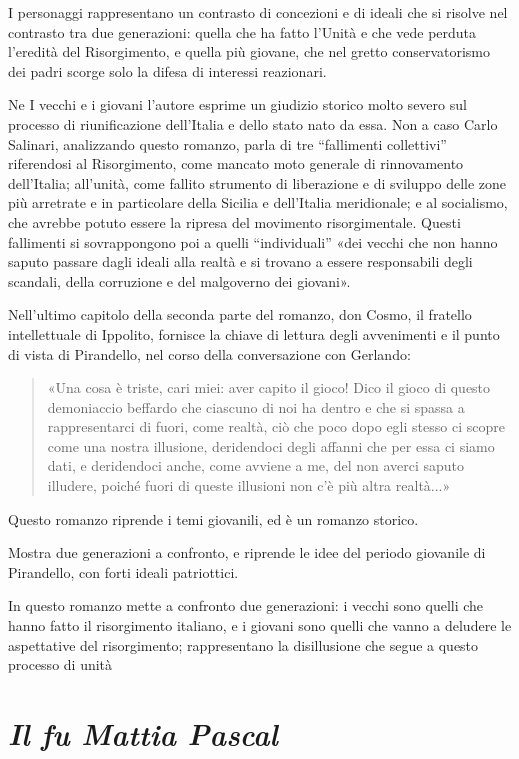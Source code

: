 \documentclass[a4paper, twoside, titlepage]{book}
\newcommand{\citazione}[1]{%
  \begin{quotation}
  \noindent #1
  \end{quotation}}
\begin{document}
I personaggi rappresentano un contrasto di concezioni e di ideali che si risolve nel contrasto tra due generazioni: quella che ha fatto l'Unità e che vede perduta l'eredità del Risorgimento, e quella più giovane, che nel gretto conservatorismo dei padri scorge solo la difesa di interessi reazionari.

Ne I vecchi e i giovani l'autore esprime un giudizio storico molto severo sul processo di riunificazione dell'Italia e dello stato nato da essa. Non a caso Carlo Salinari, analizzando questo romanzo, parla di tre “fallimenti collettivi” riferendosi al Risorgimento, come mancato moto generale di rinnovamento dell'Italia; all'unità, come fallito strumento di liberazione e di sviluppo delle zone più arretrate e in particolare della Sicilia e dell'Italia meridionale; e al socialismo, che avrebbe potuto essere la ripresa del movimento risorgimentale. Questi fallimenti si sovrappongono poi a quelli “individuali” «dei vecchi che non hanno saputo passare dagli ideali alla realtà e si trovano a essere responsabili degli scandali, della corruzione e del malgoverno dei giovani».

Nell'ultimo capitolo della seconda parte del romanzo, don Cosmo, il fratello intellettuale di Ippolito, fornisce la chiave di lettura degli avvenimenti e il punto di vista di Pirandello, nel corso della conversazione con Gerlando:

\citazione{«Una cosa è triste, cari miei: aver capito il gioco! Dico il gioco di questo demoniaccio beffardo che ciascuno di noi ha dentro e che si spassa a rappresentarci di fuori, come realtà, ciò che poco dopo egli stesso ci scopre come una nostra illusione, deridendoci degli affanni che per essa ci siamo dati, e deridendoci anche, come avviene a me, del non averci saputo illudere, poiché fuori di queste illusioni non c'è più altra realtà...»}

Questo romanzo riprende i temi giovanili, ed è un romanzo storico.

Mostra due generazioni a confronto, e riprende le idee del periodo giovanile di Pirandello, con forti ideali patriottici.

In questo romanzo mette a confronto due generazioni: i vecchi sono quelli che hanno fatto il risorgimento italiano, e i giovani sono quelli che vanno a deludere le aspettative del risorgimento; rappresentano la disillusione che segue a questo processo di unità


\chapter{\textit{Il fu Mattia Pascal}}
\end{document}
